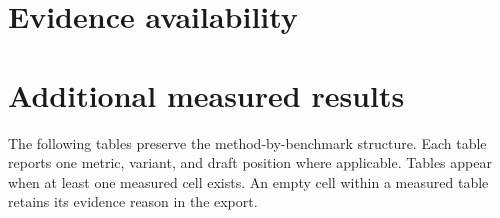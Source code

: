 \documentclass[conference,onecolumn]{IEEEtran}
\begin{document}
\section{Evidence availability}

\section{Additional measured results}
The following tables preserve the method-by-benchmark structure. Each table reports one metric, variant, and draft position where applicable. Tables appear when at least one measured cell exists. An empty cell within a measured table retains its evidence reason in the export.

\end{document}
